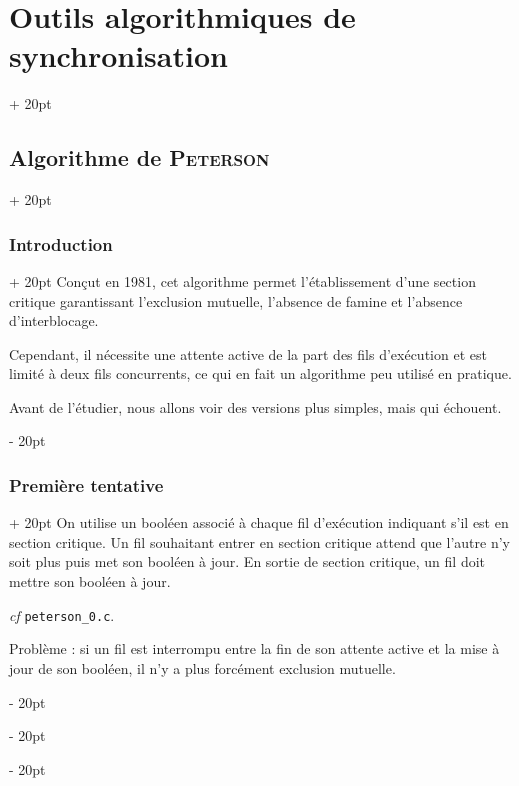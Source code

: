 \documentclass[a4paper, 12pt, twoside]{article}
\newcommand{\ind}[1][20pt]{\advance\leftskip + #1}
\newcommand{\deind}[1][20pt]{\advance\leftskip - #1}
\newenvironment{indt}[2][20pt]{#2 \par \ind[#1]}{\par \deind} %
\begin{document}
    \begin{indt}{\section{Outils algorithmiques de synchronisation}}
        \begin{indt}{\subsection{Algorithme de \textsc{Peterson}}}
            \begin{indt}{\subsubsection{Introduction}}
                Conçut en 1981, cet algorithme permet l'établissement d'une section critique garantissant l'exclusion mutuelle, l'absence de famine et l'absence d'interblocage.

                Cependant, il nécessite une attente active de la part des fils d'exécution et est limité à deux fils concurrents, ce qui en fait un algorithme peu utilisé en pratique.

                Avant de l'étudier, nous allons voir des versions plus simples, mais qui échouent.
            \end{indt}

            \vspace{12pt}
            
            \begin{indt}{\subsubsection{Première tentative}}
                On utilise un booléen associé à chaque fil d'exécution indiquant s'il est en section critique.
                Un fil souhaitant entrer en section critique attend que l'autre n'y soit plus puis met son booléen à jour.
                En sortie de section critique, un fil doit mettre son booléen à jour.

                \textit{cf} \texttt{peterson\_0.c}.

                \vspace{6pt}
                
                Problème : si un fil est interrompu entre la fin de son attente active et la mise à jour de son booléen, il n'y a plus forcément exclusion mutuelle.
            \end{indt}


\end{indt}
\end{indt}
\end{document}
